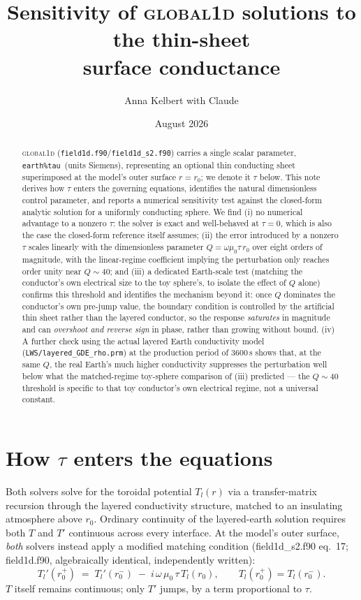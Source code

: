 \documentclass[11pt]{article}
\title{Sensitivity of \textsc{global1d} solutions to the thin-sheet\\
surface conductance \tautt}
\author{Anna Kelbert with Claude}
\date{August 2026}
\newcommand{\tautt}{\texttt{earth\%tau}}
\begin{document}
\maketitle

\begin{abstract}
\textsc{global1d} (\texttt{field1d.f90}/\texttt{field1d\_s2.f90}) carries a single scalar parameter,
\tautt\ (units Siemens), representing an optional thin conducting sheet superimposed at the model's
outer surface $r=r_0$; we denote it $\tau$ below. This note derives how $\tau$ enters the governing
equations, identifies the natural dimensionless control parameter, and reports a numerical sensitivity
test against the closed-form analytic solution for a uniformly conducting sphere. We find (i) no
numerical advantage to a nonzero $\tau$: the solver is exact and well-behaved at $\tau=0$, which is
also the case the closed-form reference itself assumes; (ii) the error introduced by a nonzero $\tau$
scales linearly with the dimensionless parameter $Q=\omega\mu_0\tau\,r_0$ over eight orders of
magnitude, with the linear-regime coefficient implying the perturbation only reaches order unity near
$Q\sim40$; and (iii) a dedicated Earth-scale test (matching the conductor's own electrical size to the
toy sphere's, to isolate the effect of $Q$ alone) confirms this threshold and identifies the
mechanism beyond it: once $Q$ dominates the conductor's own pre-jump value, the boundary condition
is controlled by the artificial thin sheet rather than the layered conductor, so the response
\emph{saturates} in magnitude and can \emph{overshoot and reverse sign} in phase, rather than growing
without bound. (iv) A further check using the actual layered Earth conductivity model
(\texttt{LWS/layered\_GDE\_rho.prm}) at the production period of 3600\,s shows that, at the same $Q$,
the real Earth's much higher conductivity suppresses the perturbation well below what the
matched-regime toy-sphere comparison of (iii) predicted --- the $Q\sim40$ threshold is specific to
that toy conductor's own electrical regime, not a universal constant.
\end{abstract}

\section{How $\tau$ enters the equations}

Both solvers solve for the toroidal potential $T_l(r)$ via a transfer-matrix recursion through the
layered conductivity structure, matched to an insulating atmosphere above $r_0$. Ordinary continuity
of the layered-earth solution requires both $T$ and $T'$ continuous across every interface. At the
model's outer surface, \emph{both} solvers instead apply a modified matching condition
(field1d\_s2.f90 eq.~17; field1d.f90, algebraically identical, independently written):
\begin{equation}
  T_l'(r_0^+) \;=\; T_l'(r_0^-) \;-\; i\,\omega\,\mu_0\,\tau\,T_l(r_0),
  \qquad T_l(r_0^+) = T_l(r_0^-).
  \label{eq:jump}
\end{equation}
$T$ itself remains continuous; only $T'$ jumps, by a term proportional to $\tau$.
\end{document}
